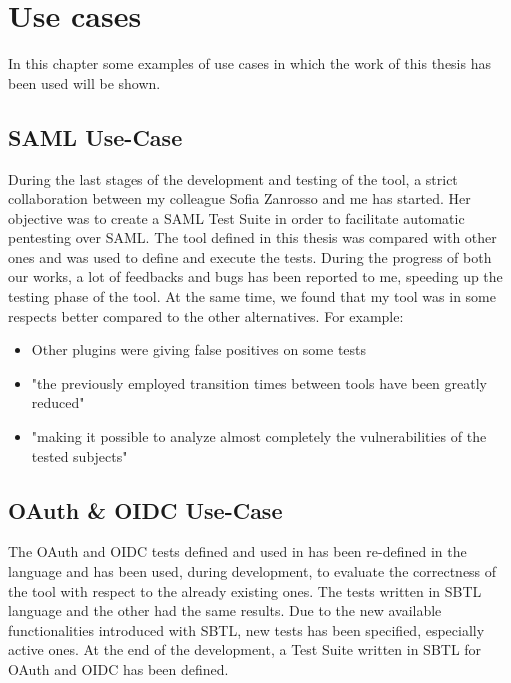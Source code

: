 \chapter{Use cases}
\label{chap:Use_cases}
In this chapter some examples of use cases in which the work of this thesis has been used will be shown.

\section{SAML Use-Case}
During the last stages of the development and testing of the tool, a strict collaboration between my colleague Sofia Zanrosso and me has started. Her objective was to create a \gls{SAML} Test Suite in order to facilitate automatic pentesting over \gls{SAML}\cite{sofia_zanrosso}. The tool defined in this thesis was compared with other ones and was used to define and execute the tests. During the progress of both our works, a lot of feedbacks and bugs has been reported to me, speeding up the testing phase of the tool. At the same time, we found that my tool was in some respects better compared to the other alternatives. For example:
\begin{itemize}
    \item Other plugins were giving false positives on some tests
    \item "the previously employed transition times between tools have been greatly reduced"
    \item "making it possible to analyze almost completely the vulnerabilities of the tested subjects"
\end{itemize}

\section{OAuth \& OIDC Use-Case}    
The \gls{OAuth} and \gls{OIDC} tests defined and used in \cite{claudio_grisenti,wendy_barreto} has been re-defined in the language and has been used, during development, to evaluate the correctness of the tool with respect to the already existing ones. The tests written in SBTL language and the other had the same results. Due to the new available functionalities introduced with SBTL, new tests has been specified, especially active ones.
At the end of the development, a Test Suite written in SBTL for OAuth and OIDC has been defined.







